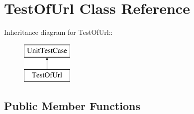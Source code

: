 \hypertarget{class_test_of_url}{
\section{TestOfUrl Class Reference}
\label{class_test_of_url}
}
Inheritance diagram for TestOfUrl::\begin{figure}[H]
\begin{center}
\leavevmode
\includegraphics[height=2cm]{class_test_of_url}
\end{center}
\end{figure}
\subsection*{Public Member Functions}
